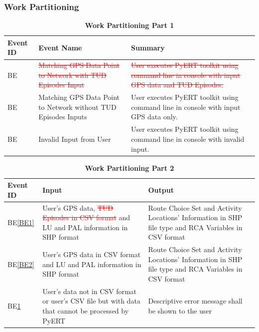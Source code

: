 \documentclass[12pt, titlepage]{article}
\newcounter{benum}
\newcommand{\bethebenum}{BE\thebenum}
\newcommand{\beref}[1]{BE\ref{#1}}
\begin{document}
\subsubsection{Work Partitioning}

\begin{table}[H]
\begin{tabular}{|p{5cm}|p{5cm}|p{5cm}|}
\hline
{\bf Event ID} & {\bf Event Name} & {\bf Summary} \\ 
\hline
 {benum} \bethebenum \label{BE1} &  \textcolor{red}{\sout{Matching GPS Data Point to Network with TUD Episodes Input}} &  \textcolor{red}{\sout{User executes PyERT toolkit using command line in console with input GPS data and TUD Episodes.}} \\ 
\hline
 {benum} \bethebenum \label{BE2} & Matching GPS Data Point to Network without TUD Episodes Inputs & User executes PyERT toolkit using command line in console with input GPS data only. \\ 
\hline
 {benum} \bethebenum \label{BE3} & Invalid Input from User & User executes PyERT toolkit using command line in console with invalid input. \\
\hline
\end{tabular}
\caption{\bf Work Partitioning Part 1}
\end{table}

\begin{table}[H]
\begin{tabular}{|p{5cm}|p{5cm}|p{5cm}|}
\hline
{\bf Event ID} & {\bf Input} & {\bf Output} \\ 
\hline
\beref{BE1} & User's GPS data,  \textcolor{red}{\sout{TUD Episodes in CSV format}} and LU and PAL information in SHP format & Route Choice Set and Activity Locations' Information in SHP file type and RCA Variables in CSV format  \\ 
\hline
\beref{BE2} & User's GPS data in CSV format and LU and PAL information in SHP format & Route Choice Set and Activity Locations' Information in SHP file type and RCA Variables in CSV format \\ 
\hline
\beref{BE3} & User's data not in CSV format or user's CSV file but with data that cannot be processed by PyERT & Descriptive error message shall be shown to the user \\ 
\hline
\end{tabular}
\caption{\bf Work Partitioning Part 2}
\end{table}
\end{document}
